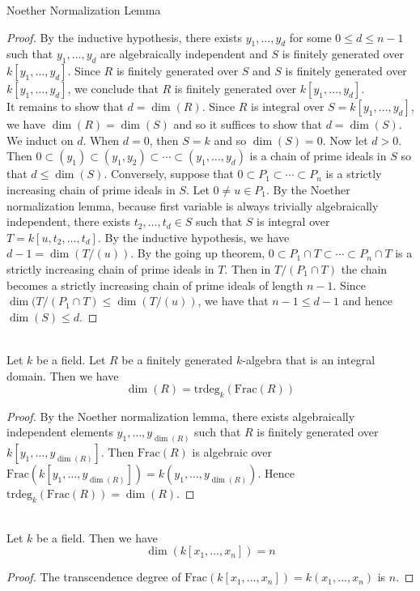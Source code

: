 \documentclass[a4paper]{article}
\begin{document}
\begin{thm}{Noether Normalization Lemma}{}
\begin{proof}
By the inductive hypothesis, there exists $y_1,\dots,y_d$ for some $0\leq d\leq n-1$ such that $y_1,\dots,y_d$ are algebraically independent and $S$ is finitely generated over $k[y_1,\dots,y_d]$. Since $R$ is finitely generated over $S$ and $S$ is finitely generated over $k[y_1,\dots,y_d]$, we conclude that $R$ is finitely generated over $k[y_1,\dots,y_d]$. \\

It remains to show that $d=\dim(R)$. Since $R$ is integral over $S=k[y_1,\dots,y_d]$, we have $\dim(R)=\dim(S)$ and so it suffices to show that $d=\dim(S)$. We induct on $d$. When $d=0$, then $S=k$ and so $\dim(S)=0$. Now let $d>0$. Then $0\subset(y_1)\subset(y_1,y_2)\subset\cdots\subset(y_1,\dots,y_d)$ is a chain of prime ideals in $S$ so that $d\leq\dim(S)$. Conversely, suppose that $0\subset P_1\subset\cdots\subset P_n$ is a strictly increasing chain of prime ideals in $S$. Let $0\neq u\in P_1$. By the Noether normalization lemma, because first variable is always trivially algebraically independent, there exists $t_2,\dots,t_d\in S$ such that $S$ is integral over $T=k[u,t_2,\dots,t_d]$. By the inductive hypothesis, we have $d-1=\dim(T/(u))$. By the going up theorem, $0\subset P_1\cap T\subset\cdots\subset P_n\cap T$ is a strictly increasing chain of prime ideals in $T$. Then in $T/(P_1\cap T)$ the chain becomes a strictly increasing chain of prime ideals of length $n-1$. Since $\dim(T/(P_1\cap T)\leq\dim(T/(u))$, we have that $n-1\leq d-1$ and hence $\dim(S)\leq d$. 
\end{proof}
\end{thm}

\begin{prp}{}{}\\
Let $k$ be a field. Let $R$ be a finitely generated $k$-algebra that is an integral domain. Then we have $$\dim(R)=\text{trdeg}_k(\text{Frac}(R))$$
\begin{proof}
By the Noether normalization lemma, there exists algebraically independent elements $y_1,\dots,y_{\dim(R)}$ such that $R$ is finitely generated over $k[y_1,\dots,y_{\dim(R)}]$. Then $\text{Frac}(R)$ is algebraic over $\text{Frac}(k[y_1,\dots,y_{\dim(R)}])=k(y_1,\dots,y_{\dim(R)})$. Hence $\text{trdeg}_k(\text{Frac}(R))=\dim(R)$. 
\end{proof}
\end{prp}

\begin{crl}{}{}\\
Let $k$ be a field. Then we have $$\dim(k[x_1,\dots,x_n])=n$$
\begin{proof}
The transcendence degree of $\text{Frac}(k[x_1,\dots,x_n])=k(x_1,\dots,x_n)$ is $n$. 
\end{proof}
\end{crl}
\end{document}
